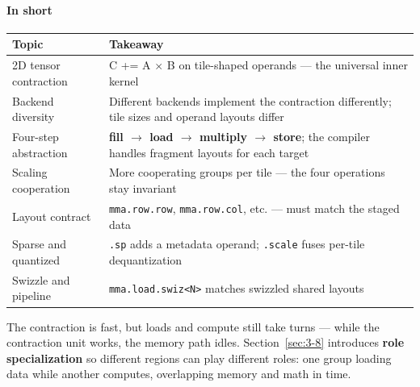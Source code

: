 \paragraph*{In short}

\begin{table}[htbp]
\centering\small
\begin{tabularx}{\linewidth}{@{}lX@{}}
\toprule
\textbf{Topic} & \textbf{Takeaway} \\
\midrule
2D tensor contraction & C += A \(\times\) B on tile-shaped operands --- the universal inner kernel \\
Backend diversity & Different backends implement the contraction differently; tile sizes and operand layouts differ \\
Four-step abstraction & \textbf{fill \(\rightarrow\) load \(\rightarrow\) multiply \(\rightarrow\) store}; the compiler handles fragment layouts for each target \\
Scaling cooperation & More cooperating groups per tile --- the four operations stay invariant \\
Layout contract & \texttt{mma.row.row}, \texttt{mma.row.col}, etc. --- must match the staged data \\
Sparse and quantized & \texttt{.sp} adds a metadata operand; \texttt{.scale} fuses per-tile dequantization \\
Swizzle and pipeline & \texttt{mma.\allowbreak{}load.\allowbreak{}swiz\textless{}N\textgreater{}} matches swizzled shared layouts \\
\bottomrule
\end{tabularx}
\end{table}

The contraction is fast, but loads and compute still take turns --- while the contraction unit works, the memory path idles. Section~\ref{sec:3-8} introduces \textbf{role specialization} so different regions can play different roles: one group loading data while another computes, overlapping memory and math in time.

